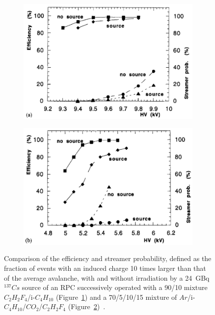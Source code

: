 	\begin{figure}[H]
		\begin{subfigure}{0.5\linewidth}
			\centering
			\includegraphics[width = 0.5\plotwidth]{fig/chapt4/Freon-perf-irrad.png}
			\caption{\label{fig:FreonArgonPerf:A}}
		\end{subfigure}
		\begin{subfigure}{0.5\linewidth}
			\centering
			\includegraphics[width = 0.5\plotwidth]{fig/chapt4/Argon-perf-irrad.png}
			\caption{\label{fig:FreonArgonPerf:B}}
		\end{subfigure}
		\caption{\label{fig:FreonArgonPerf} Comparison of the efficiency and streamer probability, defined as the fraction of events with an induced charge 10 times larger than that of the average avalanche, with and without irradiation by a \SI{24}{GBq} $^{137}Cs$ source of an RPC successively operated with a 90/10 mixture $C_2H_2F_4$/i-$C_4H_{10}$ (Figure~\ref{fig:FreonArgonPerf:A}) and a 70/5/10/15 mixture of $Ar$/i-$C_4H_{10}$/$CO_2$/$C_2H_2F_4$ (Figure~\ref{fig:FreonArgonPerf:B})~\cite{ABBRESCIA1997PERF}.}
	\end{figure}
	
